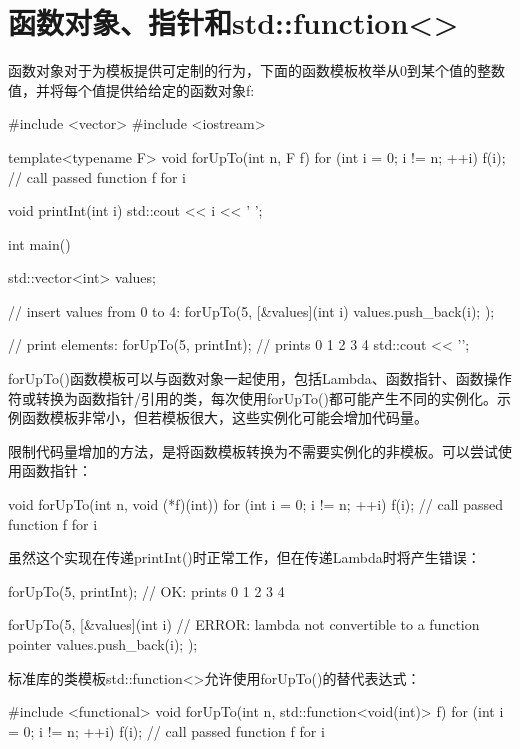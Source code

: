 \section{函数对象、指针和std::function<>}

函数对象对于为模板提供可定制的行为，下面的函数模板枚举从0到某个值的整数值，并将每个值提供给给定的函数对象f:

\begin{cpp}
#include <vector>
#include <iostream>

template<typename F>
void forUpTo(int n, F f) {
	for (int i = 0; i != n; ++i)
	{
		f(i); // call passed function f for i
	}
}

void printInt(int i) {
	std::cout << i << ' ';
}

int main() {
	std::vector<int> values;
	
	// insert values from 0 to 4:
	forUpTo(5,
	[&values](int i) {
		values.push_back(i);
	});

	// print elements:
	forUpTo(5,
			printInt); // prints 0 1 2 3 4
	std::cout << '\n';
}
\end{cpp}

forUpTo()函数模板可以与函数对象一起使用，包括Lambda、函数指针、函数操作符或转换为函数指针/引用的类，每次使用forUpTo()都可能产生不同的实例化。示例函数模板非常小，但若模板很大，这些实例化可能会增加代码量。

限制代码量增加的方法，是将函数模板转换为不需要实例化的非模板。可以尝试使用函数指针：

\begin{cpp}
void forUpTo(int n, void (*f)(int)) {
	for (int i = 0; i != n; ++i)
	{
		f(i); // call passed function f for i
	}
}
\end{cpp}

虽然这个实现在传递printInt()时正常工作，但在传递Lambda时将产生错误：

\begin{cpp}
forUpTo(5,
printInt); // OK: prints 0 1 2 3 4

forUpTo(5,
		[&values](int i) { // ERROR: lambda not convertible to a function pointer
			values.push_back(i);
		});
\end{cpp}

标准库的类模板std::function<>允许使用forUpTo()的替代表达式：

\begin{cpp}
#include <functional>
void forUpTo(int n, std::function<void(int)> f) {
	for (int i = 0; i != n; ++i)
	{
		f(i); // call passed function f for i
	}
}
\end{cpp}

